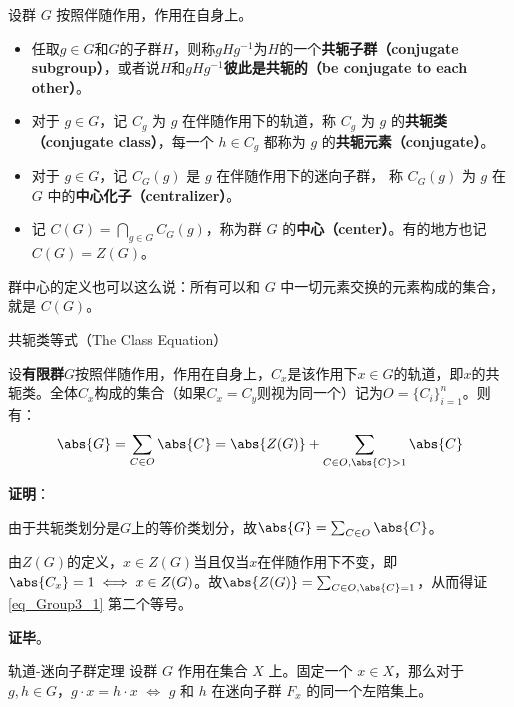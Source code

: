 \begin{definition}{}
设群 $G$ 按照伴随作用，作用在自身上。
\begin{itemize}
\item 任取$g\in G$和$G$的子群$H$，则称$gHg^{-1}$为$H$的一个\textbf{共轭子群（conjugate subgroup）}，或者说$H$和$gHg^{-1}$\textbf{彼此是共轭的（be conjugate to each other）}。
\item 对于 $g\in G$，记 $C_g$ 为 $g$ 在伴随作用下的轨道，称 $C_g$ 为 $g$ 的\textbf{共轭类（conjugate class）}，每一个 $h\in C_g$ 都称为 $g$ 的\textbf{共轭元素（conjugate）}。

\item 对于 $g\in G$，记 $C_G(g)$ 是 $g$ 在伴随作用下的迷向子群， 称 $C_G(g)$ 为 $g$ 在 $G$ 中的\textbf{中心化子（centralizer）}。

\item 记 $C(G)=\bigcap_{g\in G} C_G(g)$，称为群 $G$ 的\textbf{中心（center）}。有的地方也记$C(G)=Z(G)$。
\end{itemize}
\end{definition}

群中心的定义也可以这么说：所有可以和 $G$ 中一切元素交换的元素构成的集合，就是 $C(G)$。








\begin{theorem}{共轭类等式（The Class Equation）}\label{the_Group3_4}

设\textbf{有限群}$G$按照伴随作用，作用在自身上，$C_x$是该作用下$x\in G$的轨道，即$x$的共轭类。全体$C_x$构成的集合（如果$C_x=C_y$则视为同一个）记为$O=\{C_i\}_{i=1}^n$。则有：
\begin{equation}\label{eq_Group3_1}
\abs{G} = \sum_{C\in O} \abs{C} = \abs{Z(G)} + \sum_{C\in O, \abs{C}>1} \abs{C}
\end{equation}

\end{theorem}


\textbf{证明}：

由于共轭类划分是$G$上的等价类划分，故$\abs{G} = \sum_{C\in O} \abs{C}$。

由$Z(G)$的定义，$x\in Z(G)$当且仅当$x$在伴随作用下不变，即$\abs{C_x}=1\iff x\in Z(G)$。故$\abs{Z(G)}=\sum_{C\in O, \abs{C}=1}$，从而得证\autoref{eq_Group3_1} 第二个等号。

\textbf{证毕}。




\begin{theorem}{轨道-迷向子群定理}\label{the_Group3_2}
设群 $G$ 作用在集合 $X$ 上。固定一个 $x\in X$，那么对于 $g, h\in G$，$g\cdot x= h\cdot x$ $\iff$ $g$ 和 $h$ 在迷向子群 $F_x$ 的同一个左陪集上。
\end{theorem}

